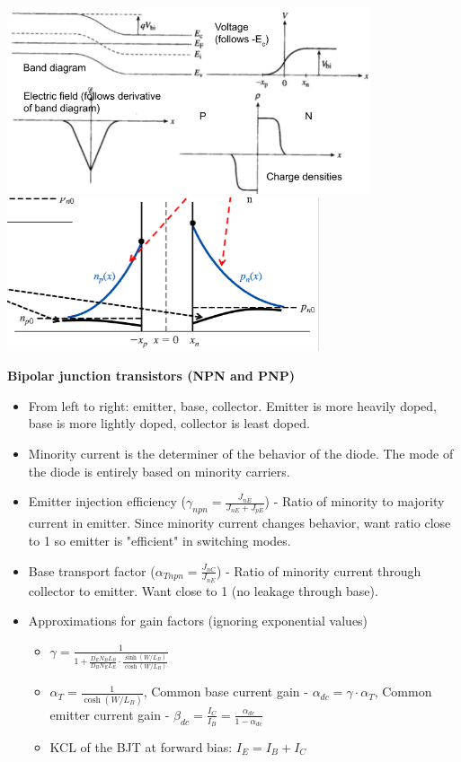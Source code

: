 \documentclass{article}
\begin{document}
\begin{center}
    \includegraphics[align=c, height=5.5cm]{pngraphs.png}
    \includegraphics[align=c, height=4.5cm]{pncarriers.png}
\end{center}
\textbf{Bipolar junction transistors (NPN and PNP)}
\begin{itemize}
    \item From left to right: emitter, base, collector. Emitter is more heavily doped, base is more lightly doped, collector is least doped.
    \item Minority current is the determiner of the behavior of the diode. The mode of the diode is entirely based on minority carriers.
    \item Emitter injection efficiency ($\gamma_{npn} = \frac{J_{nE}}{J_{nE} + J_{pE}}$) - Ratio of minority to majority current in emitter. Since minority current changes behavior, want ratio close to 1 so emitter is "efficient" in switching modes.
    \item Base transport factor ($\alpha_{Tnpn} = \frac{J_{nC}}{J_{nE}}$) - Ratio of minority current through collector to emitter. Want close to 1 (no leakage through base).
    \item Approximations for gain factors (ignoring exponential values)
    \begin{itemize}
        \item $\gamma = \frac{1}{1 + \frac{D_E N_B L_B}{D_B N_E L_E} \cdot \frac{\sinh(W / L_B)}{\cosh(W / L_B)}}$
        \item $\alpha_T = \frac{1}{\cosh(W / L_B)}$, Common base current gain - $\alpha_{dc} = \gamma \cdot \alpha_T$, Common emitter current gain - $\beta_{dc} = \frac{I_C}{I_B} = \frac{\alpha_{dc}}{1 - \alpha_{dc}}$
        \item KCL of the BJT at forward bias: $I_E = I_B + I_C$
    \end{itemize}
\end{itemize}
\end{document}
